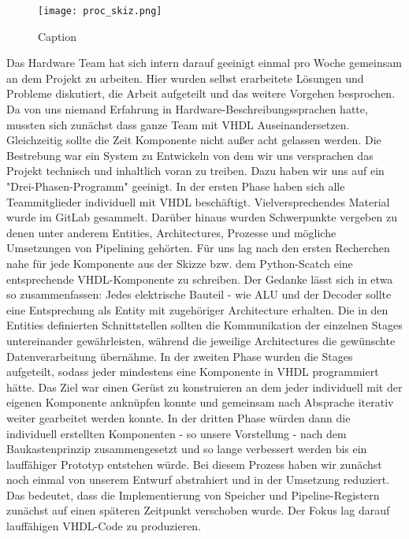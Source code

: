 \documentclass[paper=a4,fontsize=12pt,twocolumn]{scrreprt}
\begin{document}
\begin{figure}
    \centering
    \texttt{[image: proc\_skiz.png]}
    \caption{Caption}
    \label{fig:my_label}
\end{figure}


Das Hardware Team hat sich intern darauf geeinigt einmal pro Woche gemeinsam an dem Projekt zu arbeiten. 
Hier wurden selbst erarbeitete Lösungen und Probleme diskutiert, die Arbeit aufgeteilt und das weitere Vorgehen besprochen.
Da von uns niemand Erfahrung in Hardware-Beschreibungssprachen hatte, mussten sich zunächst dass ganze Team mit VHDL Auseinandersetzen.
Gleichzeitig sollte die Zeit Komponente nicht außer acht gelassen werden.
Die Bestrebung war ein System zu Entwickeln von dem wir uns versprachen das Projekt technisch und inhaltlich voran zu treiben.
Dazu haben wir uns auf ein "Drei-Phasen-Programm" geeinigt. In der ersten Phase haben sich alle Teammitglieder individuell mit VHDL beschäftigt.
Vielversprechendes Material wurde im GitLab gesammelt.
Darüber hinaus wurden Schwerpunkte vergeben zu denen unter anderem Entities, Architectures, Prozesse und mögliche Umsetzungen von Pipelining gehörten.
Für uns lag nach den ersten Recherchen nahe für jede Komponente aus der Skizze bzw. dem Python-Scatch eine entsprechende VHDL-Komponente zu schreiben.
Der Gedanke lässt sich in etwa so zusammenfassen: Jedes elektrische Bauteil - wie ALU und der Decoder sollte eine Entsprechung als Entity mit zugehöriger Architecture erhalten.
Die in den Entities definierten Schnittstellen sollten die Kommunikation der einzelnen Stages untereinander gewährleisten, während die jeweilige Architectures die gewünschte Datenverarbeitung übernähme.
In der zweiten Phase wurden die Stages aufgeteilt, sodass jeder mindestens eine Komponente in VHDL programmiert hätte.
Das Ziel war einen Gerüst zu konstruieren an dem jeder individuell mit der eigenen Komponente anknüpfen konnte und gemeinsam nach Absprache iterativ weiter gearbeitet werden konnte.
In der dritten Phase würden dann die individuell erstellten Komponenten - so unsere Vorstellung - nach dem Baukastenprinzip zusammengesetzt und so lange verbessert werden bis ein lauffähiger Prototyp entstehen würde.
Bei diesem Prozess haben wir zunächst noch einmal von unserem Entwurf abstrahiert und in der Umsetzung reduziert.
Das bedeutet, dass die Implementierung von Speicher und Pipeline-Registern zunächst auf einen späteren Zeitpunkt verschoben wurde.
Der Fokus lag darauf lauffähigen VHDL-Code zu produzieren.
\end{document}
